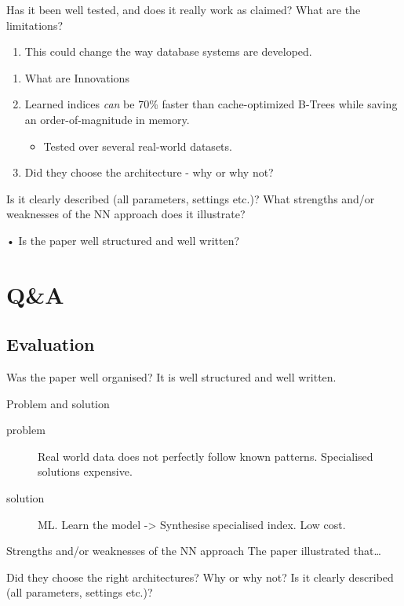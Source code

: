 \documentclass[presentation]{beamer}
\begin{document}
Has it been well tested, and does it really work as claimed? What are the limitations?
\begin{enumerate}
\item This could change the way database systems are developed.
\end{enumerate}
\begin{enumerate}
\item What are Innovations

\item \alert{Learned} indices \emph{can} be 70\% \alert{faster} than cache-optimized B-Trees while \alert{saving} an order-of-magnitude in \alert{memory}.

\begin{itemize}
\item Tested over several real-world datasets.
\end{itemize}

\item Did they choose the architecture - why or why not?
\end{enumerate}
Is it clearly described (all parameters, settings etc.)?
What strengths and/or weaknesses of the NN approach does it illustrate?


• Is the paper well structured and well written?

\section{Q\&A}
\label{sec:org9f6e412}
\subsection{Evaluation}
\label{sec:org1a9297a}
\begin{frame}[label={sec:org90217c1}]{Was the paper well organised?}
It is well structured and well written.
\end{frame}
\begin{frame}[label={sec:org1968a3b}]{Problem and solution}
\begin{description}
\item[{problem}] Real world data does not perfectly follow known patterns. Specialised solutions expensive.
\item[{solution}] ML. Learn the model -> Synthesise specialised index. Low cost.
\end{description}
\end{frame}
\begin{frame}[label={sec:orge9b27a7}]{Strengths and/or weaknesses of the NN approach}
The paper illustrated that\ldots{}
\end{frame}
\begin{frame}[label={sec:orgc585682}]{Did they choose the right architectures? Why or why not?}
Is it clearly described (all parameters, settings etc.)?
\end{frame}
\end{document}
